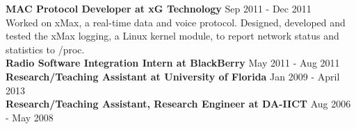 \begin{resume}
\textbf{MAC Protocol Developer at xG Technology} \hfill Sep 2011 - Dec 2011\\
Worked on xMax, a real-time data and voice protocol. Designed, developed and tested the xMax logging, a Linux kernel module, to report network status and statistics to /proc.\\
\textbf{Radio Software Integration Intern at BlackBerry} \hfill May 2011 - Aug 2011\\
\textbf{Research/Teaching Assistant at University of Florida} \hfill Jan 2009 - April 2013\\
\textbf{Research/Teaching Assistant, Research Engineer at DA-IICT} \hfill Aug 2006 - May 2008

\begin{formatb}
  \\
  \body\\
\end{formatb}


\end{resume}
